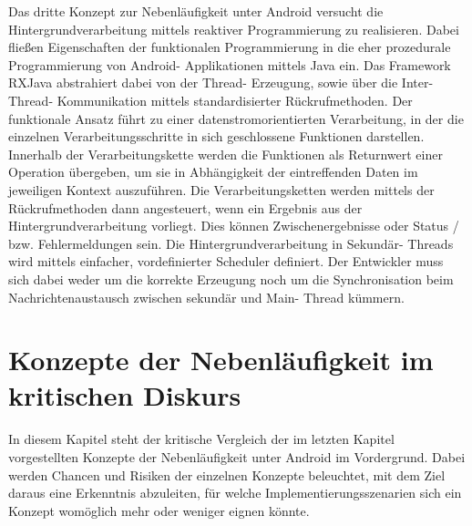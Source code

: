\documentclass[12pt,oneside,a4paper,bibtotoc,liststotoc]{scrreprt}
\begin{document}
Das dritte Konzept zur Nebenläufigkeit unter Android versucht die Hintergrundverarbeitung mittels reaktiver Programmierung zu realisieren. Dabei fließen Eigenschaften der funktionalen Programmierung in die eher prozedurale Programmierung von Android- Applikationen mittels Java ein. Das Framework RXJava abstrahiert dabei von der Thread- Erzeugung, sowie über die Inter- Thread- Kommunikation mittels standardisierter Rückrufmethoden. Der funktionale Ansatz führt zu einer datenstromorientierten Verarbeitung, in der die einzelnen Verarbeitungsschritte in sich geschlossene Funktionen darstellen. Innerhalb der Verarbeitungskette werden die Funktionen als Returnwert einer Operation übergeben, um sie in Abhängigkeit der eintreffenden Daten im jeweiligen Kontext auszuführen.  Die Verarbeitungsketten werden mittels der Rückrufmethoden dann angesteuert, wenn ein Ergebnis aus der Hintergrundverarbeitung vorliegt. Dies können Zwischenergebnisse oder Status / bzw. Fehlermeldungen sein.
Die Hintergrundverarbeitung in Sekundär- Threads wird mittels einfacher, vordefinierter Scheduler definiert. Der Entwickler muss sich dabei weder um die korrekte Erzeugung noch um die Synchronisation beim Nachrichtenaustausch zwischen sekundär und Main- Thread kümmern. \newline

\chapter{Konzepte der Nebenläufigkeit im kritischen Diskurs}
In diesem Kapitel steht der kritische Vergleich der im letzten Kapitel vorgestellten Konzepte der Nebenläufigkeit unter Android im Vordergrund. Dabei werden Chancen und Risiken der einzelnen Konzepte beleuchtet, mit dem Ziel daraus eine Erkenntnis abzuleiten, für welche Implementierungsszenarien sich ein Konzept womöglich mehr oder weniger eignen könnte.
\end{document}

